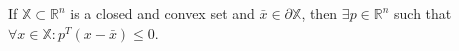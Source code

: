 If $\mathbb{X} \subset \mathbb{R}^n$ is a closed and convex set and $\bar{x} \in \partial \mathbb{X}$, then $\exists p \in \mathbb{R}^n$ such that $\forall x \in \mathbb{X}: p^T(x - \bar{x}) \leq 0$.
